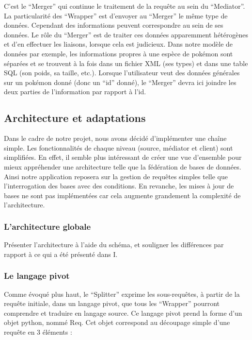 C’est le “Merger” qui continue le traitement de la requête au sein du “Mediator”. La particularité des “Wrapper” est d’envoyer au “Merger” le même type de données. Cependant des informations peuvent correspondre au sein de ses données. Le rôle du “Merger” est de traiter ces données apparemment hétérogènes et d’en effectuer les liaisons, lorsque cela est judicieux. Dans notre modèle de données par exemple, les informations propres à une espèce de pokémon sont séparées et se trouvent à la fois dans un fichier XML (ses types) et dans une table SQL (son poids, sa taille, etc.). Lorsque l’utilisateur veut des données générales sur un pokémon donné (donc un “id” donné), le “Merger” devra ici joindre les deux parties de l’information par rapport à l’id. 

\subsection{Architecture et adaptations}

Dans le cadre de notre projet, nous avons décidé d’implémenter une chaîne simple. Les fonctionnalités de chaque niveau (source, médiator et client) sont simplifiées. En effet, il semble plus intéressant de créer une vue d’ensemble pour mieux appréhender une architecture telle que la fédération de bases de données. Ainsi notre application reposera sur la gestion de requêtes simples telle que l’interrogation des bases avec des conditions. En revanche, les mises à jour de bases ne sont pas implémentées car cela augmente grandement la complexité de l’architecture.

\subsubsection{L’architecture globale}


Présenter l’architecture à l’aide du schéma, et souligner les différences par rapport à ce qui a été présenté dans I.

\subsubsection{Le langage pivot}

Comme évoqué plus haut, le “Splitter” exprime les sous-requêtes, à partir de la requête initiale, dans un langage pivot, que tous les “Wrapper” pourront comprendre et traduire en langage source. Ce langage pivot prend la forme d’un objet python, nommé Req. Cet objet correspond au découpage simple d’une requête en 3 éléments :

